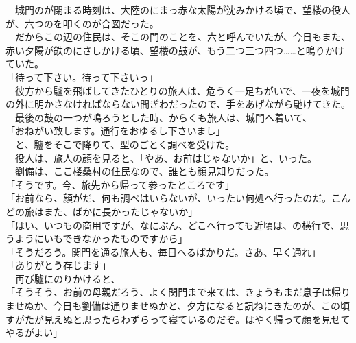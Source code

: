 \documentclass[
  paper=a5,
  fontsize=10pt,
  jafontsize=9.5pt,
  tate,                  %
  open_bracket_pos=nibu, %
]{jlreq}
\begin{document}
　城門のが閉まる時刻は、大陸のにまっ赤な太陽が沈みかける頃で、望楼の役人が、六つのを叩くのが合図だった。\\


　だからこの辺の住民は、そこの門のことを、六と呼んでいたが、今日もまた、赤い夕陽が鉄のにさしかける頃、望楼の鼓が、もう二つ三つ四つ……と鳴りかけていた。\\


「待って下さい。待って下さいっ」\\


　彼方から驢を飛ばしてきたひとりの旅人は、危うく一足ちがいで、一夜を城門の外に明かさなければならない間ぎわだったので、手をあげながら馳けてきた。\\


　最後の鼓の一つが鳴ろうとした時、からくも旅人は、城門へ着いて、\\


「おねがい致します。通行をおゆるし下さいまし」\\


　と、驢をそこで降りて、型のごとく調べを受けた。\\


　役人は、旅人の顔を見ると、「やあ、お前はじゃないか」と、いった。\\


　劉備は、ここ楼桑村の住民なので、誰とも顔見知りだった。\\


「そうです。今、旅先から帰って参ったところです」\\


「お前なら、顔がだ、何も調べはいらないが、いったい何処へ行ったのだ。こんどの旅はまた、ばかに長かったじゃないか」\\


「はい、いつもの商用ですが、なにぶん、どこへ行っても近頃は、の横行で、思うようにいもできなかったものですから」\\


「そうだろう。関門を通る旅人も、毎日へるばかりだ。さあ、早く通れ」\\


「ありがとう存じます」\\


　再び驢にのりかけると、\\


「そうそう、お前の母親だろう、よく関門まで来ては、きょうもまだ息子は帰りませぬか、今日も劉備は通りませぬかと、夕方になると訊ねにきたのが、この頃すがたが見えぬと思ったらわずらって寝ているのだぞ。はやく帰って顔を見せてやるがよい」\\
\end{document}
